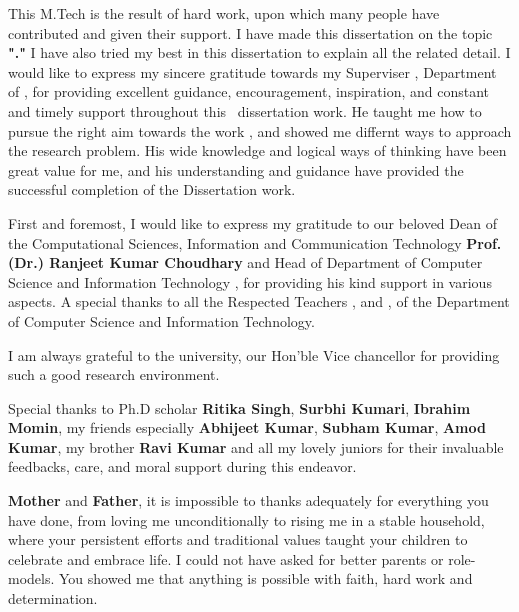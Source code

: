 
\begin{acknowledgements}
\addchaptertocentry{\acknowledgementname} %
\vspace*{2cm}
This M.Tech \rType is the result of hard work, upon which many people have contributed and given their support. I
have made this dissertation on the topic \textbf{"\ReportTitel ."} I have also tried my best in this dissertation to
explain all the related detail. I would like to express my sincere gratitude towards my Superviser \textbf{
	\Supervisor}, Department of \depS, for providing excellent guidance, encouragement, inspiration, and constant and
timely support throughout this \DegreeS \  dissertation work. He taught me how to pursue the right aim towards the work
, and showed me differnt ways to approach the research problem. His wide knowledge and logical ways of thinking have
been great value for me, and his understanding and guidance have provided the successful completion of the
Dissertation work.

First and foremost, I would like to express my gratitude to our beloved Dean of the Computational Sciences,
Information and Communication Technology \textbf{Prof. (Dr.) Ranjeet Kumar Choudhary} and Head of Department of Computer Science and Information Technology \textbf{\HodName},
for providing his kind support in various aspects. A special thanks to all the Respected Teachers
\textbf{\Facone}, and \textbf{\Factwo}, of the Department of Computer Science and Information
Technology.

I am always grateful to the university, our Hon’ble Vice chancellor \textbf{\Vc} for providing
such a good research environment.

	Special thanks to Ph.D scholar \textbf{Ritika Singh}, \textbf{Surbhi Kumari}, \textbf{Ibrahim Momin}, my friends especially  \textbf{Abhijeet Kumar}, \textbf{Subham Kumar},  \textbf{Amod Kumar}, my brother \textbf{Ravi Kumar} and all my lovely juniors  for their invaluable feedbacks, care, and moral support during this endeavor.

	\textbf{Mother} and \textbf{Father}, it is impossible to thanks adequately for everything you have done, from
loving me unconditionally to rising me in a stable household, where your persistent efforts and traditional values
taught your children to celebrate and embrace life. I could not have asked for better parents or role-models. You
showed me that anything is possible with faith, hard work and determination. 



\end{acknowledgements}
